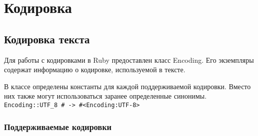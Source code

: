 \section{Кодировка}

\subsection{Кодировка текста}

Для работы с кодировками в Ruby предоставлен класс Encoding. Его экземпляры содержат информацию о кодировке, используемой в тексте.

В классе определены константы для каждой поддерживаемой кодировки. Вместо них также могут использоваться заранее определенные синонимы.
\\\verb!Encoding::UTF_8 # -> #<Encoding:UTF-8>! 

\subsubsection*{Поддерживаемые кодировки}

